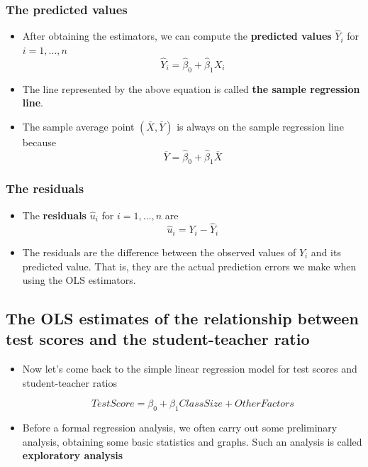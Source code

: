 \documentclass[11pt]{article}
\begin{document}
\subsubsection*{The predicted values}
\label{sec:orga8a080f}

\begin{itemize}
\item After obtaining the estimators, we can compute the \textbf{predicted values}
\(\hat{Y}_i\) for \(i=1, \ldots, n\)
$$\hat{Y}_i = \hat{\beta}_0 + \hat{\beta}_1 X_i$$

\item The line represented by the above equation is called \textbf{the sample
regression line}.

\item The sample average point \((\overline{X}, \overline{Y})\) is
always on the sample regression line because
\[ \overline{Y} = \hat{\beta}_0 + \hat{\beta}_1 \overline{X} \]
\end{itemize}

\subsubsection*{The residuals}
\label{sec:org66b66ac}

\begin{itemize}
\item The \textbf{residuals} \(\hat{u}_i\) for \(i = 1, \ldots, n\) are
$$\hat{u}_i = Y_i - \hat{Y}_i$$

\item The residuals are the difference between the observed values of
\(Y_i\) and its predicted value. That is, they are the actual
prediction errors we make when using the OLS estimators.
\end{itemize}


\subsection*{The OLS estimates of the relationship between test scores and the student-teacher ratio}
\label{sec:org1773b75}

\begin{itemize}
\item Now let's come back to the simple linear regression model for test
scores and student-teacher ratios

$$TestScore = \beta_0 + \beta_1 ClassSize + OtherFactors$$

\item Before a formal regression analysis, we often carry out some
preliminary analysis, obtaining some basic statistics and
graphs. Such an analysis is called \textbf{exploratory analysis}
\end{itemize}
\end{document}
